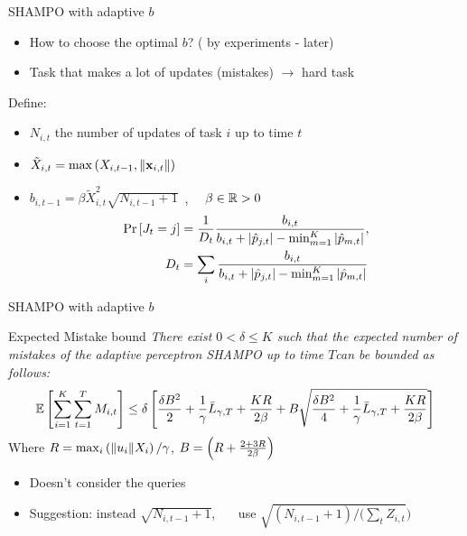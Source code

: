 \documentclass{beamer}
\begin{document}
%
%
 \begin{frame}{SHAMPO with adaptive $b$ }
 \begin{itemize}
 \item How to choose the optimal $b$? ( by experiments - later)\newline

 \item
Task that makes a lot of updates (mistakes) $\longrightarrow$ hard task  \newline
 \end{itemize}
 Define:
 \begin{itemize}
 \item $N_{i,t}$ the number of updates of task $i$ up to time $t$ \newline
 \item  $\tilde{X}_{i,t} = \max\left({X_{i,t-1},\Vert\mathbf{x}_{i,t}\Vert}\right)$\newline
 \item  $b_{i,t-1}=\beta  \tilde{X}_{i,t}^2\sqrt{N_{i,t-1}+1}$~,~~ $\beta\in\mathbb{R}>0$
 \begin{align}
 {\rm Pr}\left[{J_t=j}\right] &=\frac{1}{D_t}\frac{b_{i,t}}{b_{i,t}+\left\vert{\hat{p}_{j,t}}\right\vert-\min_{m=1}^K\left\vert{\hat{p}_{m,t}}\right\vert},\nonumber\\
D_t &=\sum_i \frac{b_{i,t}}{b_{i,t}+\left\vert{\hat{p}_{j,t}}\right\vert-\min_{m=1}^K\left\vert{\hat{p}_{m,t}}\right\vert}
 \end{align}
 \end{itemize}
 \end{frame}


 \begin{frame}{SHAMPO with adaptive $b$}
 \begin{block}{Expected Mistake bound}
  \emph{There exist $0<\delta\le K$ such that the expected  number of mistakes  of the  adaptive 
  perceptron SHAMPO  up to time $T$can be bounded as follows:}
 \begin{displaymath}
\mathbb{E}\left[{ \sum_{i=1}^{K}\sum_{t=1}^{T}{M_{i,t}}}\right]
\le \delta\left[{\frac{\delta B^2}{2}+\frac{1}{\gamma}{\bar L}_{\gamma,T}+\frac{KR}{2\beta}
+ B\sqrt{\frac{\delta B^2}{4}+\frac{1}{\gamma}{\bar L}_{\gamma,T}+\frac{KR}{2\beta}}}\right]
 \end{displaymath}
 Where $R = \max_i{\left({\Vert u_i\Vert X_i}\right)/{\gamma}}$, $B=\left({R+\frac{2+3R}{2\beta}}\right)$ 
 \end{block}
 \begin{itemize}
 \item Doesn't consider the queries\newline
 \item Suggestion: instead $\sqrt{N_{i,t-1}+1}$, ~~~use $\sqrt{(N_{i,t-1}+1)/(\sum_t{Z_{i,t}}})$  \newline
 \end{itemize}
 \end{frame}
\end{document}
